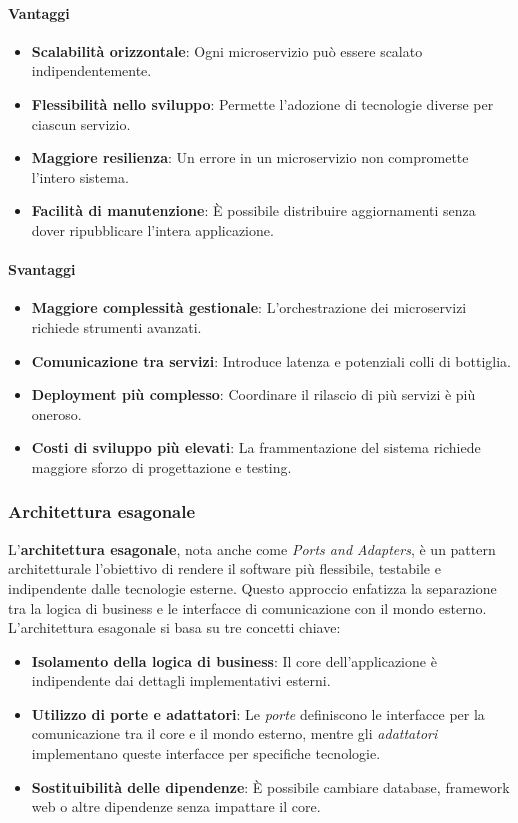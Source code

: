 \paragraph{Vantaggi}  
\begin{itemize}
    \item \textbf{Scalabilità orizzontale}: Ogni microservizio può essere scalato indipendentemente.
    \item \textbf{Flessibilità nello sviluppo}: Permette l’adozione di tecnologie diverse per ciascun servizio.
    \item \textbf{Maggiore resilienza}: Un errore in un microservizio non compromette l’intero sistema.
    \item \textbf{Facilità di manutenzione}: È possibile distribuire aggiornamenti senza dover ripubblicare l’intera applicazione.
\end{itemize}
\paragraph{Svantaggi}  
\begin{itemize}
    \item \textbf{Maggiore complessità gestionale}: L’orchestrazione dei microservizi richiede strumenti avanzati.
    \item \textbf{Comunicazione tra servizi}: Introduce latenza e potenziali colli di bottiglia.
    \item \textbf{Deployment più complesso}: Coordinare il rilascio di più servizi è più oneroso.
    \item \textbf{Costi di sviluppo più elevati}: La frammentazione del sistema richiede maggiore sforzo di progettazione e testing.
\end{itemize}

\subsubsection{Architettura esagonale}
L’\textbf{architettura esagonale}, nota anche come \textit{Ports and Adapters}, è un pattern architetturale l'obiettivo di rendere il software più flessibile, testabile e indipendente dalle tecnologie esterne. Questo approccio enfatizza la separazione tra la logica di business e le interfacce di comunicazione con il mondo esterno.
L'architettura esagonale si basa su tre concetti chiave:
\begin{itemize}
    \item \textbf{Isolamento della logica di business}: Il core dell'applicazione è indipendente dai dettagli implementativi esterni.
    \item \textbf{Utilizzo di porte e adattatori}: Le \textit{porte} definiscono le interfacce per la comunicazione tra il core e il mondo esterno, mentre gli \textit{adattatori} implementano queste interfacce per specifiche tecnologie.
    \item \textbf{Sostituibilità delle dipendenze}: È possibile cambiare database, framework web o altre dipendenze senza impattare il core.
\end{itemize}

